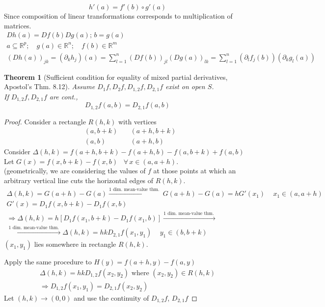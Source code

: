 \documentclass[twoside]{amsart}
\theoremstyle{plain}
\newtheorem{theorem}{Theorem}
\theoremstyle{definition}
\begin{document}
\[
h'(a) = f'(b) \circ g'(a)
\]
Since composition of linear transformations corresponds to multiplication of matrices.  
\[
\begin{gathered}
  Dh(a) = Df(b) Dg(a); \, b= g(a) \\
  a \subseteq \mathbb{R}^p; \quad g(a) \in \mathbb{R}^n; \quad f(b) \in \mathbb{R}^m \\
  (Dh(a))_{jk} = (\partial_k h_j)(a) = \sum_{l=1}^n (Df(b))_{jl} (Dg(a))_{lk} = \sum_{l=1}^n (\partial_l f_j(b))(\partial_k g_l(a))
\end{gathered}
\]

\begin{theorem}[Sufficient condition for equality of mixed partial derivatives, Apostol's Thm. 8.12]
  Assume $D_1 f, D_2 f, D_{1,2} f, D_{2,1} f$ exist on open $S$.   \\
  If $D_{1,2} f, D_{2,1} f$ are cont., 
\begin{equation*}
D_{1,2} f(a,b) = D_{2,1} f(a,b)
\end{equation*}
\end{theorem}
\begin{proof} Consider a rectangle $R(h,k)$ with vertices
\[
\begin{aligned}
  & (a,b+k) \quad & (a+h,b+k) \\ 
  & (a,b) \quad & (a+h,b)
\end{aligned}
\]
Consider $\Delta (h,k) = f(a+h,b+k) - f(a+h,b) - f(a,b+k) + f(a,b)$ \medskip \\
Let $G(x) = f(x,b+k) - f(x,b)$ \, $\forall \, x \in (a,a+h)$.  \\
(geometrically, we are considering the values of $f$ at those points at which an arbitrary vertical line cuts the horizontal edges of $R(h,k)$.  
\[
\begin{gathered}
  \Delta (h,k) = G(a+h) - G(a) \xrightarrow{ 1 \text{ dim. mean-value thm. } } G(a+h) -G(a) = h G'(x_1) \quad \, x_1 \in (a,a+h) \\
  G'(x) = D_1 f(x,b+k) - D_1 f(x,b) \\
  \Longrightarrow \Delta (h,k) = h[D_1 f(x_1, b+k) - D_1 f(x_1,b)] \xrightarrow{ 1 \text{ dim. mean-value thm. } } \\
 \xrightarrow{ 1 \text{ dim. mean-value thm. } } \Delta (h,k) = hk D_{2,1} f(x_1,y_1) \quad \, y_1 \in (b,b+k) 
\end{gathered}
\]
$(x_1,y_1)$ lies somewhere in rectangle $R(h,k)$.  

Apply the same procedure to $H(y) = f(a+h,y) - f(a,y)$
\[
\begin{gathered}
  \Delta (h,k) = hk D_{1,2} f(x_2,y_2) \text{ where } (x_2,y_2) \in R(h,k) \\
  \Longrightarrow D_{1,2} f(x_1,y_1) = D_{2,1} f(x_2,y_2)
\end{gathered}
\]
Let $(h,k) \to (0,0)$ and use the continuity of $D_{1,2} f$, $D_{2,1} f$
\end{proof} 
\end{document}
